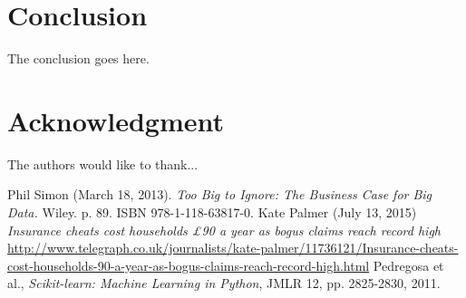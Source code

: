 \documentclass[conference, onecolumn]{IEEEtran}
\begin{document}
%



\section{Conclusion}
The conclusion goes here.






\section*{Acknowledgment}


The authors would like to thank...





\begin{thebibliography}{99}
 Phil Simon (March 18, 2013). \emph{Too Big to Ignore: The Business Case for Big Data.} Wiley. p. 89. ISBN 978-1-118-63817-0.
 Kate Palmer (July 13, 2015)  \emph{Insurance cheats cost households £90 a year as bogus claims reach record high}\\
\url{http://www.telegraph.co.uk/journalists/kate-palmer/11736121/Insurance-cheats-cost-households-90-a-year-as-bogus-claims-reach-record-high.html}
 Pedregosa et al., \emph{Scikit-learn: Machine Learning in Python},  JMLR 12, pp. 2825-2830, 2011.


\end{thebibliography}
\end{document}
